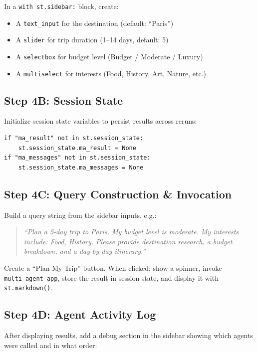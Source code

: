 \documentclass[11pt, letterpaper]{article}
\begin{document}
In a \texttt{with st.sidebar:} block, create:
\begin{itemize}[nosep]
  \item A \texttt{text\_input} for the destination (default: ``Paris'')
  \item A \texttt{slider} for trip duration (1--14 days, default: 5)
  \item A \texttt{selectbox} for budget level (Budget / Moderate / Luxury)
  \item A \texttt{multiselect} for interests (Food, History, Art, Nature, etc.)
\end{itemize}

\subsection*{Step 4B: Session State}

Initialize session state variables to persist results across reruns:

\begin{lstlisting}
if "ma_result" not in st.session_state:
    st.session_state.ma_result = None
if "ma_messages" not in st.session_state:
    st.session_state.ma_messages = None
\end{lstlisting}

\subsection*{Step 4C: Query Construction \& Invocation}

Build a query string from the sidebar inputs, e.g.:

\begin{quote}
\textit{``Plan a 5-day trip to Paris. My budget level is moderate. My interests include: Food, History. Please provide destination research, a budget breakdown, and a day-by-day itinerary.''}
\end{quote}

\noindent Create a ``Plan My Trip'' button. When clicked: show a spinner, invoke \texttt{multi\_agent\_app}, store the result in session state, and display it with \texttt{st.markdown()}.

\subsection*{Step 4D: Agent Activity Log}

After displaying results, add a debug section in the sidebar showing which agents were called and in what order:
\end{document}
